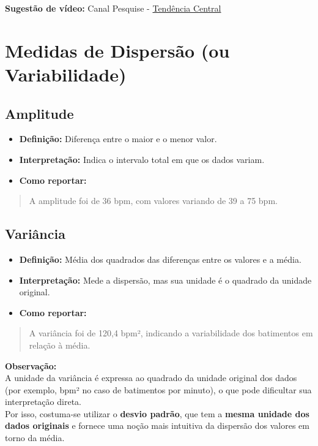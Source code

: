 \documentclass[
]{book}
\providecommand{\tightlist}{%
  \setlength{\itemsep}{0pt}\setlength{\parskip}{0pt}}
\begin{document}
\textbf{Sugestão de vídeo:} Canal Pesquise - \href{https://youtu.be/ot0aDB-grDY}{Tendência Central}

\section{Medidas de Dispersão (ou Variabilidade)}\label{medidas-de-dispersuxe3o-ou-variabilidade}

\subsection{Amplitude}\label{amplitude}

\begin{itemize}
\tightlist
\item
  \textbf{Definição:} Diferença entre o maior e o menor valor.\\
\item
  \textbf{Interpretação:} Indica o intervalo total em que os dados variam.\\
\item
  \textbf{Como reportar:}
\end{itemize}

\begin{quote}
A amplitude foi de 36 bpm, com valores variando de 39 a 75 bpm.
\end{quote}

\subsection{Variância}\label{variuxe2ncia}

\begin{itemize}
\tightlist
\item
  \textbf{Definição:} Média dos quadrados das diferenças entre os valores e a média.\\
\item
  \textbf{Interpretação:} Mede a dispersão, mas sua unidade é o quadrado da unidade original.\\
\item
  \textbf{Como reportar:}
\end{itemize}

\begin{quote}
A variância foi de 120,4 bpm², indicando a variabilidade dos batimentos em relação à média.
\end{quote}

\textbf{Observação:}\\
A unidade da variância é expressa ao quadrado da unidade original dos dados (por exemplo, bpm² no caso de batimentos por minuto), o que pode dificultar sua interpretação direta.\\
Por isso, costuma-se utilizar o \textbf{desvio padrão}, que tem a \textbf{mesma unidade dos dados originais} e fornece uma noção mais intuitiva da dispersão dos valores em torno da média.
\end{document}
